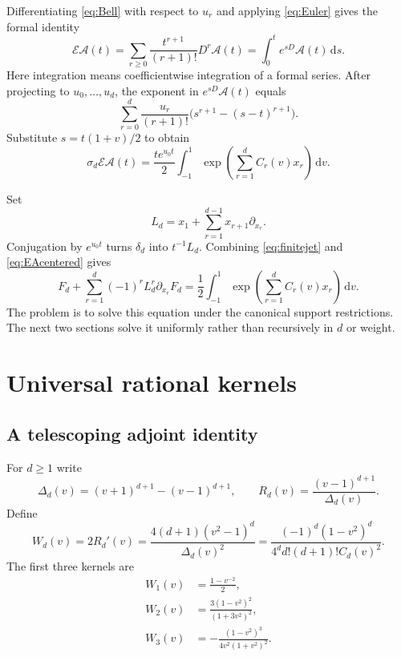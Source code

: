 \documentclass[11pt,letterpaper]{article}
\numberwithin{equation}{section}
\theoremstyle{plain}
\theoremstyle{definition}
\theoremstyle{remark}
\newcommand{\Ac}{\mathcal A}\newcommand{\Nc}{\mathcal N}\newcommand{\Hc}{\mathcal H}
\newcommand{\Ec}{\mathscr E}\newcommand{\dd}{\,\mathrm d}
\begin{document}
Differentiating \eqref{eq:Bell} with respect to $u_r$ and applying \eqref{eq:Euler} gives the formal identity
\begin{equation}\label{eq:EA}
 \Ec\Ac(t)=\sum_{r\ge0}\frac{t^{r+1}}{(r+1)!}D^r\Ac(t)
          =\int_0^t e^{sD}\Ac(t)\dd s.
\end{equation}
Here integration means coefficientwise integration of a formal series. After projecting to $u_0,\ldots,u_d$, the exponent in $e^{sD}\Ac(t)$ equals
\[
 \sum_{r=0}^d\frac{u_r}{(r+1)!}
             \bigl(s^{r+1}-(s-t)^{r+1}\bigr).
\]
Substitute $s=t(1+v)/2$ to obtain
\begin{equation}\label{eq:EAcentered}
 \sigma_d\Ec\Ac(t)=\frac{te^{u_0t}}2
     \int_{-1}^1\exp\left(\sum_{r=1}^d C_r(v)x_r\right)\dd v.
\end{equation}

Set
\begin{equation}\label{eq:Ld}
 L_d=x_1+\sum_{r=1}^{d-1}x_{r+1}\partial_{x_r}.
\end{equation}
Conjugation by $e^{u_0t}$ turns $\delta_d$ into $t^{-1}L_d$. Combining \eqref{eq:finitejet} and \eqref{eq:EAcentered} gives
\begin{equation}\label{eq:general-PDE}
 \boxed{\displaystyle
 F_d+\sum_{r=1}^d(-1)^rL_d^r\partial_{x_r}F_d
 =\frac12\int_{-1}^1\exp\left(\sum_{r=1}^dC_r(v)x_r\right)\dd v.}
\end{equation}
The problem is to solve this equation under the canonical support restrictions. The next two sections solve it uniformly rather than recursively in $d$ or weight.



\section{Universal rational kernels}
\label{sec:kernels}

\subsection{A telescoping adjoint identity}

For $d\ge1$ write
\begin{equation}\label{eq:DeltaR}
 \Delta_d(v)=(v+1)^{d+1}-(v-1)^{d+1},\qquad
 R_d(v)=\frac{(v-1)^{d+1}}{\Delta_d(v)}.
\end{equation}
Define
\begin{equation}\label{eq:Wd}
 W_d(v)=2R_d'(v)
       =\frac{4(d+1)(v^2-1)^d}{\Delta_d(v)^2}
       =\frac{(-1)^d(1-v^2)^d}{4^d d!(d+1)!C_d(v)^2}.
\end{equation}
The first three kernels are
\begin{align}
 W_1(v)&=\frac{1-v^{-2}}2,\label{eq:W1}\\
 W_2(v)&=\frac{3(1-v^2)^2}{(1+3v^2)^2},\label{eq:W2}\\
 W_3(v)&=-\frac{(1-v^2)^3}{4v^2(1+v^2)^2}.\label{eq:W3}
\end{align}
\end{document}
